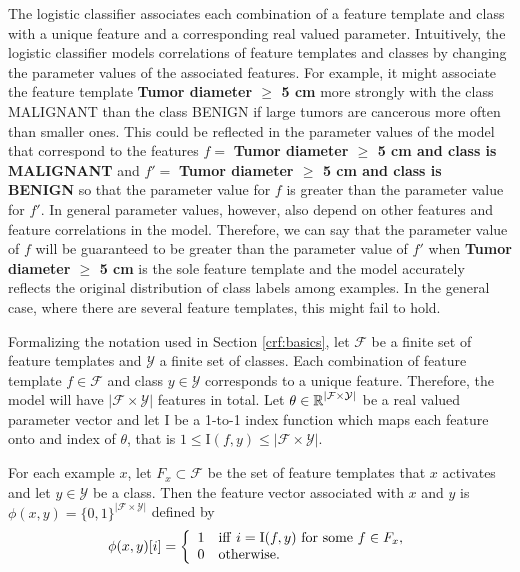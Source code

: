 The logistic classifier associates each combination of a feature
template and class with a unique feature and a corresponding real
valued parameter. Intuitively, the logistic classifier models
correlations of feature templates and classes by changing the
parameter values of the associated features. For example, it might
associate the feature template {\bf Tumor diameter $\geq$ 5 cm} more
strongly with the class MALIGNANT than the class BENIGN if large
tumors are cancerous more often than smaller ones. This could be
reflected in the parameter values of the model that correspond to the
features $f =$ {\bf Tumor diameter $\geq$ 5 cm and class is MALIGNANT}
and $f' =$ {\bf Tumor diameter $\geq$ 5 cm and class is BENIGN} so
that the parameter value for $f$ is greater than the parameter value
for $f'$. In general parameter values, however, also depend on other
features and feature correlations in the model. Therefore, we can say
that the parameter value of $f$ will be guaranteed to be greater than
the parameter value of $f'$ when {\bf Tumor diameter $\geq$ 5 cm} is
the sole feature template and the model accurately reflects the
original distribution of class labels among examples. In the general
case, where there are several feature templates, this might fail to
hold.

Formalizing the notation used in Section \ref{crf:basics}, let $\mathcal{F}$ be
a finite set of feature templates and $\mathcal{Y}$ a finite set of
classes. Each combination of feature template $f \in \mathcal{F}$ and class $y
\in \mathcal{Y}$ corresponds to a unique feature. Therefore, the model will have
$|\mathcal{F} \times \mathcal{Y}|$ features in total. Let $\theta \in \mbox{$\mathbb R$}^{|\mathcal{F} \times \mathcal{Y}|}$ be a real valued
parameter vector and let ${\mathrm I}$ be a
1-to-1 index function which maps each feature onto and index of $\theta$, that is $1 \leq {\mathrm I}(f,
y) \leq |\mathcal{F} \times \mathcal{Y}|$.

For each example $x$, let $F_x \subset \mathcal{F}$ be the set of feature templates that $x$ activates and let $y \in \mathcal{Y}$ be a class. Then the feature vector associated with $x$ and $y$ is $\phi(x,y) = \{0, 1\}^{|\mathcal{F} \times \mathcal{Y}|}$ defined by
\[
  \phi(x,y)[i] = \left\{
  \begin{array}{ll}
  1 & {\rm iff\ } i = {\mathrm I}(f,y) {\rm\ for\ some\ }f \in F_x{\rm,} \\ 
  0 & {\rm otherwise.}  
  \end{array}
  \right.
\]


